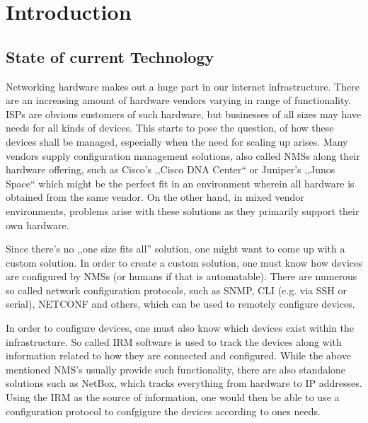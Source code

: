 \chapter{\label{introduction}Introduction}
\thispagestyle{fancy}


\section{\label{introduction-current}State of current Technology}

Networking hardware makes out a huge part in our internet infrastructure. 
There are an increasing amount of hardware vendors varying in range of functionality. 
\glspl{ISP} are obvious customers of such hardware, but businesses of all sizes may have needs for all kinds of devices. 
This starts to pose the question, of how these devices shall be managed, especially when the need for scaling up arises. 
Many vendors supply configuration management solutions, also called \glspl{NMS} along their hardware offering, 
such as Cisco's ,,Cisco DNA Center``\cite{noauthor_cisco_nodate} or Juniper's ,,Junos Space``\cite{noauthor_junos_nodate} 
which might be the perfect fit in an environment wherein all hardware is obtained from the same vendor.
On the other hand, in mixed vendor environments, 
problems arise with these solutions as they primarily support their own hardware.

Since there's no ,,one size fits all'' solution, one might want to come up with a custom solution.
In order to create a custom solution, one must know how devices are configured by \acrshort{NMS}s 
(or humans if that is automatable). There are numerous so called network configuration protocols, 
such as \acrshort{SNMP}\cite{fedor_simple_1990}, CLI (e.g. via SSH or serial), NETCONF\cite{enns_network_2011} and others,
which can be used to remotely configure devices.

In order to configure devices, one must also know which devices exist within the infrastructure.
So called \acrfull{IRM} software is used to track the devices along with
information related to how they are connected and configured. 
While the above mentioned \acrshort{NMS}'s usually provide such functionality, there are also
standalone solutions such as NetBox, which tracks everything from hardware to IP addresses.
Using the \acrshort{IRM} as the source of information, one would then be able to use a configuration protocol
to confgigure the devices according to ones needs.

